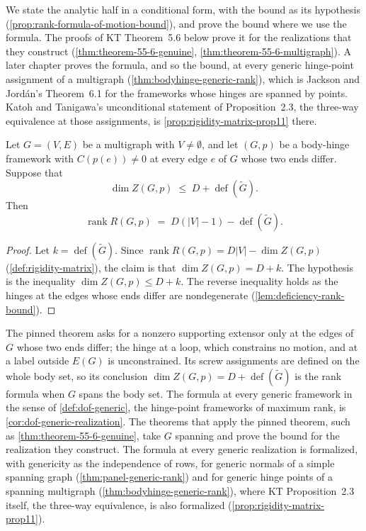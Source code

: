 We state the analytic half in a conditional form, with the bound as its
hypothesis (\cref{prop:rank-formula-of-motion-bound}), and prove the bound
where we use the formula. The proofs of KT Theorem~5.6 below prove it
for the realizations that they construct
(\cref{thm:theorem-55-6-genuine}, \cref{thm:theorem-55-6-multigraph}).
A later chapter proves the formula, and so the bound, at every generic
hinge-point assignment of a multigraph
(\cref{thm:bodyhinge-generic-rank}), which is Jackson and Jord\'an's
Theorem~6.1 for the frameworks whose hinges are spanned by points. Katoh
and Tanigawa's unconditional statement of Proposition~2.3, the three-way
equivalence at those assignments, is \cref{prop:rigidity-matrix-prop11}
there.

\begin{proposition}
  \label{prop:rank-formula-of-motion-bound}
  \leanok
  Let $G = (V, E)$ be a multigraph with $V \neq \emptyset$, and let
  $(G,p)$ be a body-hinge framework with $C(p(e)) \neq 0$ at every edge
  $e$ of $G$ whose two ends differ. Suppose that
  \[
    \dim Z(G,p) \;\le\; D + \operatorname{def}(\tilde G).
  \]
  Then
  \[
    \operatorname{rank} R(G,p) \;=\; D(|V|-1) - \operatorname{def}(\tilde G).
  \]
\end{proposition}
\begin{proof}
  \leanok
  Let $k = \operatorname{def}(\tilde G)$. Since
  $\operatorname{rank} R(G,p) = D|V| - \dim Z(G,p)$
  (\cref{def:rigidity-matrix}), the claim is that
  $\dim Z(G,p) = D + k$. The hypothesis is the inequality
  $\dim Z(G,p) \le D + k$. The reverse inequality holds as the hinges
  at the edges whose ends differ are nondegenerate
  (\cref{lem:deficiency-rank-bound}).
\end{proof}

\begin{fmlnote}
  The pinned theorem asks for a nonzero supporting extensor only at the
  edges of $G$ whose two ends differ; the hinge at a loop, which
  constrains no motion, and at a label outside $E(G)$ is unconstrained.
  Its screw assignments are defined on the whole body set, so its conclusion
  $\dim Z(G,p) = D + \operatorname{def}(\tilde G)$ is the rank formula
  when $G$ spans the body set. The formula at every generic framework in
  the sense of \cref{def:dof-generic}, the hinge-point frameworks of
  maximum rank, is \cref{cor:dof-generic-realization}. The theorems
  that apply the pinned theorem, such as
  \cref{thm:theorem-55-6-genuine}, take $G$ spanning and prove the bound
  for the realization they construct. The formula at every generic
  realization is formalized, with genericity as the independence of
  rows, for generic normals of a simple spanning graph
  (\cref{thm:panel-generic-rank}) and for generic hinge points of a
  spanning multigraph (\cref{thm:bodyhinge-generic-rank}), where KT
  Proposition~2.3 itself, the three-way equivalence, is also formalized
  (\cref{prop:rigidity-matrix-prop11}).
\end{fmlnote}


